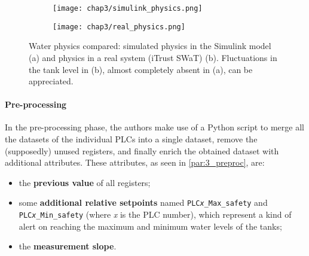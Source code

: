 \pagebreak
\begin{figure}[ht]
	\centering
	\begin{subfigure}{0.9\textwidth}
		\texttt{[image: chap3/simulink\_physics.png]}
		\caption{}
		\label{subfig:simulink_physics}
	\end{subfigure}
	\hfill
	\begin{subfigure}{0.9\textwidth}
		\texttt{[image: chap3/real\_physics.png]}
		\caption{}
		\label{subfig:real_physics}
	\end{subfigure}
	\caption{Water physics compared: simulated physics in the Simulink model (a) and physics in a real system (iTrust SWaT) (b). Fluctuations in the tank level in (b), almost completely absent in (a), can be appreciated.}
	\label{fig:testbed_physics}
\end{figure}

\paragraph{Pre-processing}
\label{par:3_preproc_limitation}
In the pre-processing phase, the authors make use of a Python script to merge all the datasets of the individual PLCs into a single dataset, remove the (supposedly) unused registers, and finally enrich the obtained dataset with additional attributes. These attributes, as seen in \ref{par:3_preproc}, are:

\begin{itemize}
	\item the \textbf{previous value} of all registers;
	
	\item some \textbf{additional relative setpoints} named \texttt{PLC\textit{x}\_Max\_safety} and\\ 
	\texttt{PLC\textit{x}\_Min\_safety} (where \textit{x} is the PLC number), which represent a kind of alert on reaching the maximum and minimum water levels of the tanks;
	
	\item the \textbf{measurement slope}.	
\end{itemize}

